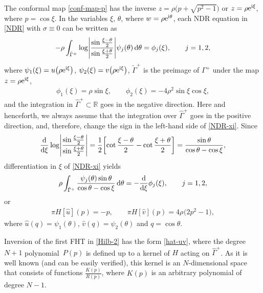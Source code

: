 \documentclass[pdftex]{sigma}
\numberwithin{equation}{section}
\newcommand{\G}{\Gamma}
\def\R{{\mathbb R}}
\def\r{\rho}
\def\s{ {\sigma}}
\def\th{ {\theta}}
\def\x{\xi}
\def\hf{\frac{1}{2}}
\def\s{\sigma}
\def\G{\Gamma}
\def\r{\rho}
\def\th{\theta}
\begin{document}
The conformal map \eqref{conf-map-p} has the inverse $z=\rho\bigl(p+\sqrt{p^2-1}\bigr)$ or $z=\rho {\rm e}^{{\rm i}\xi}$, where $p=\cos \xi$. In the variables $\xi$, $\th$, where $w=\rho {\rm e}^{{\rm i}\th}$, each NDR equation in \eqref{NDR} with $\s\equiv 0$ can be written as
\begin{gather}\label{NDR-xi}
-\r\int_{\tilde\G^+}\log\Biggl|\frac{\sin \frac{\x-\th}{2}}{\sin \frac{\x+\th}{2}}\Biggr|\psi_j(\th)\,{\rm d}\th=
\phi_j(\xi),\qquad j=1,2,
\end{gather}
where $\psi_1(\xi)=u\bigl(\r {\rm e}^{{\rm i}\xi}\bigr)$, $\psi_2(\xi)=v\bigl(\r {\rm e}^{{\rm i}\xi}\bigr)$, $\tilde\G^+$ is the preimage of $\G^+$ under the map $z=\rho {\rm e}^{{\rm i}\xi}$,
\begin{gather*}%
\phi_1(\xi)= \r\sin\x, \qquad
\phi_2(\xi)= -4\rho^2 \sin\xi\cos\xi,
\end{gather*}
and the integration in $\hat\G^+\subset \R$ goes in the negative direction. Here and henceforth, we always assume that the integration over $\hat\G^+$ goes in the positive direction, and, therefore, change the sign in the left-hand side of \eqref{NDR-xi}.
Since
\begin{gather*}
\frac{{\rm d}}{{\rm d}\x}\log\Biggl|\frac{\sin \frac{\x-\th}{2}}{\sin \frac{\x+\th}{2}}\Biggr|=\hf\biggl[ \cot \frac{\x-\th}{2}- \cot \frac{\x+\th}{2} \biggr]=
\frac{\sin\th}{\cos\th-\cos\x},
\end{gather*}
differentiation in $\x$ of \eqref{NDR-xi} yields
\begin{gather*}%
\r\int_{\tilde\G^+}\frac{\psi_j(\th)\sin\th}{\cos\th-\cos\x}\,{\rm d}\th=
-\frac{{\rm d}}{{\rm d}\xi}\phi_j(\xi),\qquad j=1,2,
\end{gather*}
or
\begin{align}\label{Hilb-2}
\pi H[\hat u](p)=-p,\qquad
\pi H[\hat v](p)=4\rho^{} \bigl(2p^2-1\bigr),
\end{align}
where $\hat u(q)=\psi_1(\th)$, $\hat v(q)=\psi_2(\th)$ and $q=\cos\th$.

Inversion of the first FHT in \eqref{Hilb-2} has the form \eqref{hat-uv}, where the degree $N+1$ polynomial~$P(p)$ is defined up to a kernel of $H$ acting on $\hat\G^+$.
As it is well known (and can be easily verified), this kernel is an $N$-dimensional space that consists of functions $\frac{K(p)}{R(p)}$, where $K(p)$ is an arbitrary
polynomial of degree $N-1$.
\end{document}
